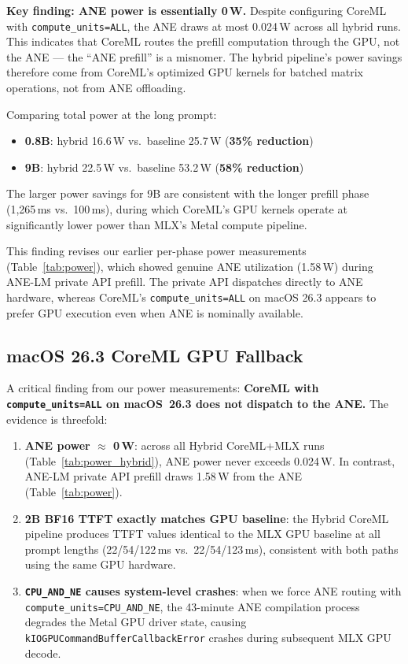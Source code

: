 \documentclass[11pt]{article}
\begin{document}
\textbf{Key finding: ANE power is essentially 0\,W.}
Despite configuring CoreML with \texttt{compute\_units=ALL}, the ANE
draws at most 0.024\,W across all hybrid runs.
This indicates that CoreML routes the prefill computation through the
GPU, not the ANE --- the ``ANE prefill'' is a misnomer.
The hybrid pipeline's power savings therefore come from CoreML's
optimized GPU kernels for batched matrix operations, not from ANE
offloading.

Comparing total power at the long prompt:
\begin{itemize}[topsep=2pt,itemsep=1pt]
  \item \textbf{0.8B}: hybrid 16.6\,W vs.\ baseline 25.7\,W
    (\textbf{35\% reduction})
  \item \textbf{9B}: hybrid 22.5\,W vs.\ baseline 53.2\,W
    (\textbf{58\% reduction})
\end{itemize}
The larger power savings for 9B are consistent with the longer prefill
phase (1{,}265\,ms vs.\ 100\,ms), during which CoreML's GPU kernels
operate at significantly lower power than MLX's Metal compute pipeline.

This finding revises our earlier per-phase power measurements
(Table~\ref{tab:power}), which showed genuine ANE utilization (1.58\,W)
during ANE-LM private API prefill.
The private API dispatches directly to ANE hardware, whereas CoreML's
\texttt{compute\_units=ALL} on macOS 26.3 appears to prefer GPU
execution even when ANE is nominally available.

\subsection{macOS 26.3 CoreML GPU Fallback}
\label{sec:coreml_gpu_fallback}

A critical finding from our power measurements: \textbf{CoreML with
\texttt{compute\_units=ALL} on macOS~26.3 does not dispatch to the ANE.}
The evidence is threefold:

\begin{enumerate}[topsep=2pt,itemsep=1pt]
  \item \textbf{ANE power $\approx$ 0\,W}: across all Hybrid CoreML+MLX
    runs (Table~\ref{tab:power_hybrid}), ANE power never exceeds 0.024\,W.
    In contrast, ANE-LM private API prefill draws 1.58\,W from the ANE
    (Table~\ref{tab:power}).
  \item \textbf{2B BF16 TTFT exactly matches GPU baseline}: the Hybrid
    CoreML pipeline produces TTFT values identical to the MLX GPU baseline
    at all prompt lengths (22/54/122\,ms vs.\ 22/54/123\,ms), consistent
    with both paths using the same GPU hardware.
  \item \textbf{\texttt{CPU\_AND\_NE} causes system-level crashes}:
    when we force ANE routing with \texttt{compute\_units=CPU\_AND\_NE},
    the 43-minute ANE compilation process degrades the Metal GPU driver
    state, causing \texttt{kIOGPUCommandBufferCallbackError} crashes during
    subsequent MLX GPU decode.
\end{enumerate}
\end{document}
